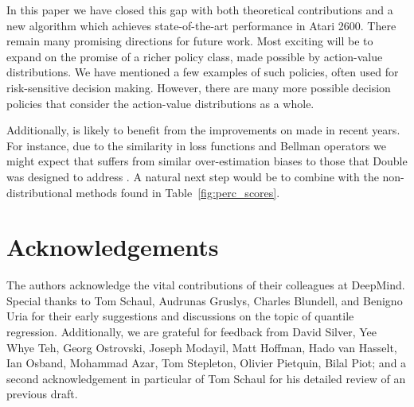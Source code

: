 \documentclass[letterpaper]{article}
\begin{document}
In this paper we have closed this gap with both theoretical contributions and a new algorithm which achieves state-of-the-art performance in Atari 2600.
There remain many promising directions for future work. Most exciting will be to expand on the promise of a richer policy class, made possible by action-value distributions. We have mentioned a few examples of such policies, often used for risk-sensitive decision making. However, there are many more possible decision policies that consider the action-value distributions as a whole.

Additionally,  is likely to benefit from the improvements on  made in recent years. For instance, due to the similarity in loss functions and Bellman operators we might expect that  suffers from similar over-estimation biases to those that Double  was designed to address \cite{vanhasselt16deep}. A natural next step would be to combine  with the non-distributional methods found in Table~\ref{fig:perc_scores}.

\section*{Acknowledgements}
The authors acknowledge the vital contributions of their colleagues at DeepMind. Special thanks to Tom Schaul, Audrunas Gruslys, Charles Blundell, and Benigno Uria for their early suggestions and discussions on the topic of quantile regression. Additionally, we are grateful for feedback from David Silver, Yee Whye Teh, Georg Ostrovski, Joseph Modayil, Matt Hoffman, Hado van Hasselt, Ian Osband, Mohammad Azar, Tom Stepleton, Olivier Pietquin, Bilal Piot; and a second acknowledgement in particular of Tom Schaul for his detailed review of an previous draft.
\end{document}
